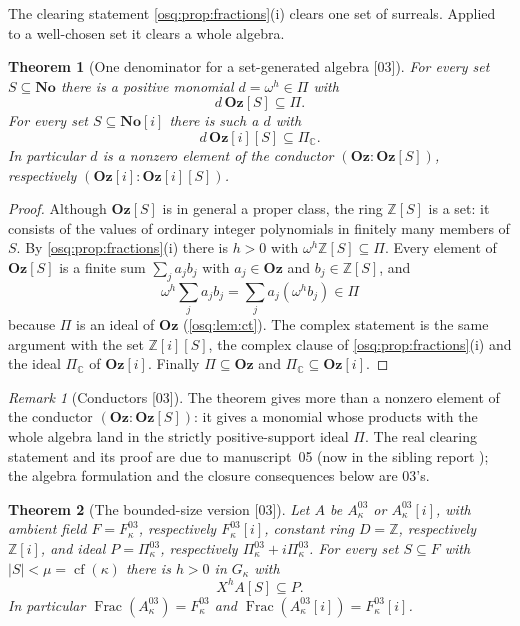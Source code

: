 \documentclass[11pt,letterpaper]{article}
\numberwithin{equation}{section}
\newtheorem{theorem}{Theorem}[section]
\theoremstyle{definition}
\theoremstyle{remark}
\newtheorem{remark}[remark]{Remark}
\theoremstyle{plain}
\newcommand{\No}{\mathbf{No}}
\newcommand{\Oz}{\mathbf{Oz}}
\newcommand{\SC}{\No[i]}
\newcommand{\GOz}{\Oz[i]}
\newcommand{\Z}{\mathbb Z}
\newcommand{\C}{\mathbb C}
\newcommand{\Frac}{\operatorname{Frac}}
\newcommand{\cf}{\operatorname{cf}}
\newcommand{\src}[1]{\textup{\textsf{[#1]}}}
\begin{document}
The clearing statement \cref{osq:prop:fractions}(i) clears one set of surreals. Applied to
a well-chosen set it clears a whole algebra.

\begin{theorem}[One denominator for a set-generated algebra \src{03}]\label{osq:nm:thm:onedenominator}
For every set $S\subseteq\No$ there is a positive monomial $d=\omega^h\in\Pi$ with
\begin{equation}\label{osq:nm:eq:fullabsorption}
 d\,\Oz[S]\subseteq\Pi .
\end{equation}
For every set $S\subseteq\SC$ there is such a $d$ with
\begin{equation}\label{osq:nm:eq:complexabsorption}
 d\,\GOz[S]\subseteq\Pi_\C .
\end{equation}
In particular $d$ is a nonzero element of the conductor $(\Oz:\Oz[S])$, respectively
$(\GOz:\GOz[S])$.
\end{theorem}

\begin{proof}
Although $\Oz[S]$ is in general a proper class, the ring $\Z[S]$ is a set: it consists of
the values of ordinary integer polynomials in finitely many members of $S$. By
\cref{osq:prop:fractions}(i) there is $h>0$ with $\omega^h\Z[S]\subseteq\Pi$. Every element
of $\Oz[S]$ is a finite sum $\sum_ja_jb_j$ with $a_j\in\Oz$ and $b_j\in\Z[S]$, and
\[
 \omega^h\sum_ja_jb_j=\sum_ja_j(\omega^hb_j)\in\Pi
\]
because $\Pi$ is an ideal of $\Oz$ (\cref{osq:lem:ct}). The complex statement is the same
argument with the set $\Z[i][S]$, the complex clause of \cref{osq:prop:fractions}(i) and
the ideal $\Pi_\C$ of $\GOz$. Finally $\Pi\subseteq\Oz$ and $\Pi_\C\subseteq\GOz$.
\end{proof}

\begin{remark}[Conductors \src{03}]\label{osq:nm:rem:conductor}
The theorem gives more than a nonzero element of the conductor $(\Oz:\Oz[S])$: it gives
a monomial whose products with the whole algebra land in the strictly positive-support
ideal $\Pi$. The real clearing statement and its proof are due to manuscript~05 (now in
the sibling report \cite{RepoOdg}); the algebra formulation and the closure consequences
below are 03's.
\end{remark}

\begin{theorem}[The bounded-size version \src{03}]\label{osq:nm:thm:smallabsorption}
Let $A$ be $A^{03}_\kappa$ or $A^{03}_\kappa[i]$, with ambient field $F=F^{03}_\kappa$,
respectively $F^{03}_\kappa[i]$, constant ring $D=\Z$, respectively $\Z[i]$, and ideal
$P=\Pi^{03}_\kappa$, respectively $\Pi^{03}_\kappa+i\Pi^{03}_\kappa$. For every set
$S\subseteq F$ with $|S|<\mu=\cf(\kappa)$ there is $h>0$ in $G_\kappa$ with
\begin{equation}\label{osq:nm:eq:smallabsorption}
 X^h A[S]\subseteq P .
\end{equation}
In particular $\Frac(A^{03}_\kappa)=F^{03}_\kappa$ and
$\Frac(A^{03}_\kappa[i])=F^{03}_\kappa[i]$.
\end{theorem}
\end{document}
